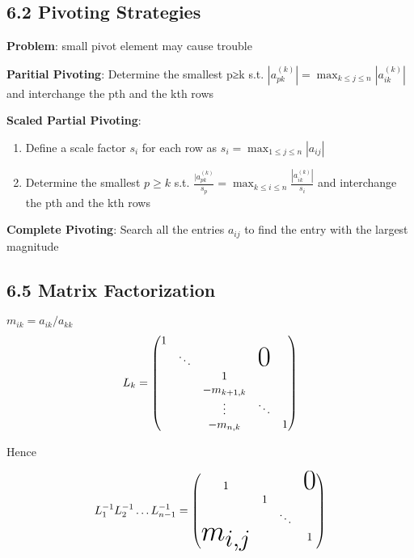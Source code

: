 \documentclass[11pt]{article}
\begin{document}
\subsection{6.2 Pivoting Strategies}
\label{sec:org6722136}
\textbf{Problem}: small pivot element may cause trouble

\textbf{Paritial Pivoting}: Determine the smallest p≥k s.t.
 \(|a_{pk}^{(k)}|=\displaystyle\max_{k\le j\le n}|a_{ik}^{(k)}|\) and
 interchange the pth and the kth rows

\textbf{Scaled Partial Pivoting}:
\begin{enumerate}
\item Define a scale factor \(s_i\) for each row as \(s_i=\displaystyle\max_{1\le
       j\le n}|a_{ij}|\)
\item Determine the smallest \(p\ge k\) s.t.
\(\frac{|a_{pk}^{(k)}}{s_p}=\displaystyle\max_{k\le i\le
       n}\frac{|a_{ik}^{(k)}|}{s_i}\)
and interchange the pth and the kth rows
\end{enumerate}


\textbf{Complete Pivoting}: Search all the entries \(a_{ij}\) to find the entry with
 the largest magnitude
\subsection{6.5 Matrix Factorization}
\label{sec:org57bca8a}
\(m_{ik}=a_{ik}/a_{kk}\)
\begin{equation*}
L_k=
\begin{pmatrix}
1 &            &            &               &  \\
  & \ddots     &            &\mbox{\Huge 0} &  \\
  &            & 1          &               &  \\
  &            & -m_{k+1,k} &               &  \\
  &            & \vdots     & \ddots        &  \\
  &            & -m_{n,k}   &               & 1\\
\end{pmatrix}
\end{equation*}  


Hence 

\begin{equation*}
L_1^{-1}L_2^{-1}\dots L_{n-1}^{-1}=
\begin{pmatrix}
1&&&\mbox{\Huge 0}\\
&1&&\\
&&\ddots&\\
\text{\Huge $m_{i,j}$}&&&1\\
\end{pmatrix}
\end{equation*}
\end{document}
